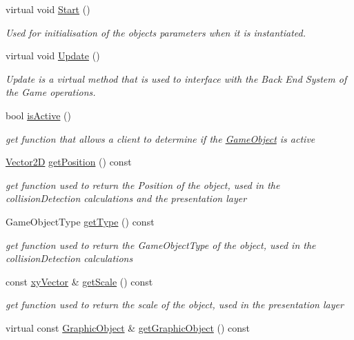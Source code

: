\begin{DoxyCompactItemize}
virtual void \hyperlink{class_game_object_aeeb2162f2779e5591a372a1568bc5c68}{Start} ()
\begin{DoxyCompactList}\small\item\em Used for initialisation of the objects parameters when it is instantiated. \end{DoxyCompactList}\item 
virtual void \hyperlink{class_game_object_ac7ecc123dacaba955077420caabf5e64}{Update} ()
\begin{DoxyCompactList}\small\item\em Update is a virtual method that is used to interface with the Back End System of the Game operations. \end{DoxyCompactList}\item 
bool \hyperlink{class_game_object_a7cc83eeefc6e3d112e2a7fc1fb037a9c}{is\+Active} ()
\begin{DoxyCompactList}\small\item\em get function that allows a client to determine if the \hyperlink{class_game_object}{Game\+Object} is active \end{DoxyCompactList}\item 
\hyperlink{class_vector2_d}{Vector2D} \hyperlink{class_game_object_ae3b21cc28e2c1bce6707699d0312eee8}{get\+Position} () const
\begin{DoxyCompactList}\small\item\em get function used to return the Position of the object, used in the collision\+Detection calculations and the presentation layer \end{DoxyCompactList}\item 
Game\+Object\+Type \hyperlink{class_game_object_af12345846c74b72bc50c779c00b55851}{get\+Type} () const
\begin{DoxyCompactList}\small\item\em get function used to return the Game\+Object\+Type of the object, used in the collision\+Detection calculations \end{DoxyCompactList}\item 
const \hyperlink{structxy_vector}{xy\+Vector} \& \hyperlink{class_game_object_a0e0c63e1c3deedae400d62d3ecab8ef3}{get\+Scale} () const
\begin{DoxyCompactList}\small\item\em get function used to return the scale of the object, used in the presentation layer \end{DoxyCompactList}\item 
virtual const \hyperlink{class_graphic_object}{Graphic\+Object} \& \hyperlink{class_game_object_af44533690a46d5f41aeaa2c16bf867b9}{get\+Graphic\+Object} () const

\end{DoxyCompactItemize}
